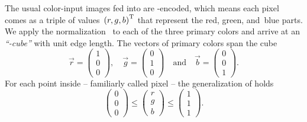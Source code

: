 The usual color-input images fed into \App{} are
-encoded, which means each pixel comes as a triple of
values~${(r, g, b)}^{\mathrm{T}}$ that represent the red, green, and~blue
parts.  We apply the
normalization~ to each of the
three primary colors and arrive at an \emph{``-cube''}
with unit edge length.  The vectors of primary colors span the cube
\[
  \vec{r} = \left(\begin{array}{c}1\\ 0\\ 0\end{array}\right),\quad
  \vec{g} = \left(\begin{array}{c}0\\ 1\\ 0\end{array}\right)\quad \mbox{and}\quad
  \vec{b} = \left(\begin{array}{c}0\\ 0\\ 1\end{array}\right).
\]
For each point inside -- familiarly called
pixel -- the generalization of  holds
\begin{equation}\label{equ:rgb-cube}
  \left(\begin{array}{c}0\\ 0\\ 0\end{array}\right) \leq
  \left(\begin{array}{c}r\\ g\\ b\end{array}\right) \leq
  \left(\begin{array}{c}1\\ 1\\ 1\end{array}\right).
\end{equation}


